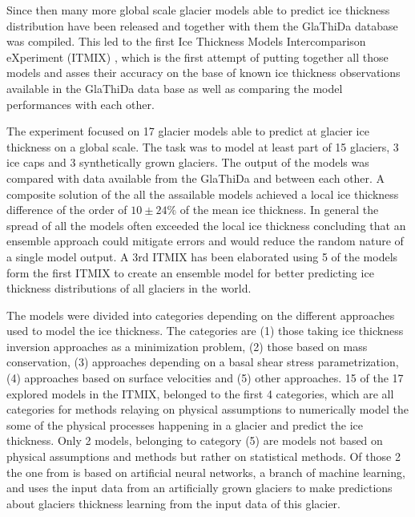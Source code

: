 Since then many more global scale glacier models able to predict ice thickness distribution have been released and together with them the GlaThiDa database was compiled. This led to the first Ice Thickness Models Intercomparison eXperiment (ITMIX) \cite{Farinotti2017}, which is the first attempt of putting together all those models and asses their accuracy on the base of known ice thickness observations available in the GlaThiDa data base as well as comparing the model performances with each other. 

The experiment focused on 17 glacier models able to predict at glacier ice thickness on a global scale. The task was to model at least part of 15 glaciers, 3 ice caps and 3 synthetically grown glaciers. The output of the models was compared with data available from the GlaThiDa and between each other. A composite solution of the all the assailable models achieved a local ice thickness difference of the order of $10 \pm 24\%$ of the mean ice thickness. In general the spread of all the  models often exceeded the local ice thickness concluding that an ensemble approach could mitigate errors and would reduce the random nature of a single model output. A 3rd ITMIX \cite{Farinotti2019} has been elaborated using 5 of the models form the first ITMIX to create an ensemble model for better predicting ice thickness distributions of all glaciers in the world.  

The models were divided into categories depending on the different approaches used to model the ice thickness. The categories are (1) those taking ice thickness inversion approaches as a minimization problem, (2) those based on mass conservation,  (3) approaches depending on a basal shear stress parametrization, (4) approaches based on surface velocities and (5) other approaches. 15 of the 17 explored models in the ITMIX, belonged to the first 4 categories, which are all categories for methods relaying on physical assumptions to numerically model the some of the physical processes happening in a glacier and predict the ice thickness. Only 2 models, belonging to category (5) are models not based on physical assumptions and methods but rather on statistical methods. Of those 2 the one from \citet{Clarke2009} is based on artificial neural networks, a branch of machine learning, and uses the input data from an artificially grown glaciers to make predictions about glaciers thickness learning from the input data of this glacier.

